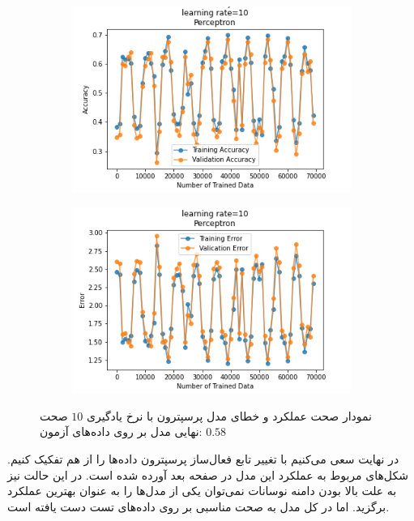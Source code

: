 \documentclass[12pt, a4paper]{article}
\begin{document}
\begin{figure}[h]
    \begin{subfigure}{0.45\linewidth}
        \centering
        \includegraphics[width=\linewidth]{images/5/perceptron/lr/acc_10.png}
    \end{subfigure}
    \hfil
    \begin{subfigure}{0.45\linewidth}
        \centering
        \includegraphics[width=\linewidth]{images/5/perceptron/lr/error_10.png}
    \end{subfigure}
    \caption{نمودار صحت عملکرد‌ و خطای مدل پرسپترون با نرخ یادگیری $10$
    \newline
    صحت نهایی مدل بر روی داده‌های آزمون: $0.58$}
\end{figure}

در نهایت سعی می‌کنیم با تغییر تابع فعال‌ساز پرسپترون داده‌ها را از هم تفکیک کنیم.
شکل‌های مربوط به عملکرد این مدل در صفحه بعد آورده شده است.
در این حالت نیز به علت بالا بودن دامنه نوسانات نمی‌توان یکی از مدل‌ها را به عنوان بهترین عملکرد برگزید.
اما در کل مدل به صحت مناسبی بر روی داده‌های تست دست‌ یافته است.
\end{document}

